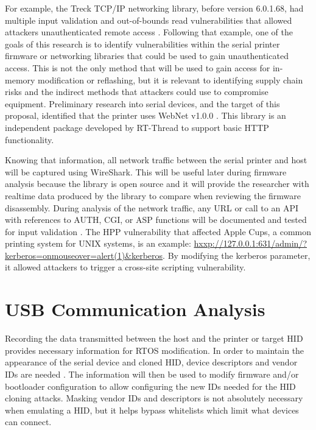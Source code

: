 For example, the Treck TCP/IP networking library, before version 6.0.1.68, had multiple input validation and out-of-bounds read vulnerabilities that allowed attackers unauthenticated remote access \autocite{NVDCVE202025066,NVDCVE202027336,NVDCVE202027338,NVDCVE202027337}. Following that example, one of the goals of this research is to identify vulnerabilities within the serial printer firmware or networking libraries that could be used to gain unauthenticated access. This is not the only method that will be used to gain access for in-memory modification or reflashing, but it is relevant to identifying supply chain risks and the indirect methods that attackers could use to compromise equipment. Preliminary research into serial devices, and the target of this proposal, identified that the printer uses WebNet v1.0.0 \autocite{RTThreadpackagesWebnet2024}. This library is an independent package developed by RT-Thread to support basic HTTP functionality.

Knowing that information, all network traffic between the serial printer and host will be captured using WireShark. This will be useful later during firmware analysis because the library is open source and it will provide the researcher with realtime data produced by the library to compare when reviewing the firmware disassembly. During analysis of the network traffic, any URL or call to an API with references to AUTH, CGI, or ASP functions will be documented and tested for input validation \autocite{WSTGLatestOWASP}. The HPP vulnerability that affected Apple Cups, a common printing system for UNIX systems, is an example: \url{hxxp://127.0.0.1:631/admin/?kerberos=onmouseover=alert(1)&kerberos}. By modifying the kerberos parameter, it allowed attackers to trigger a cross-site scripting vulnerability.

\section{USB Communication Analysis} \label{usbcommanalysis}

Recording the data transmitted between the host and the printer or target HID provides necessary information for RTOS modification. In order to maintain the appearance of the serial device and cloned HID, device descriptors and vendor IDs are needed \autocite{karystinosSpyduinoArduinoHID2019,SoKPlugPray}. The information will then be used to modify firmware and/or bootloader configuration to allow configuring the new IDs needed for the HID cloning attacks. Masking vendor IDs and descriptors is not absolutely necessary when emulating a HID, but it helps bypass whitelists which limit what devices can connect.

